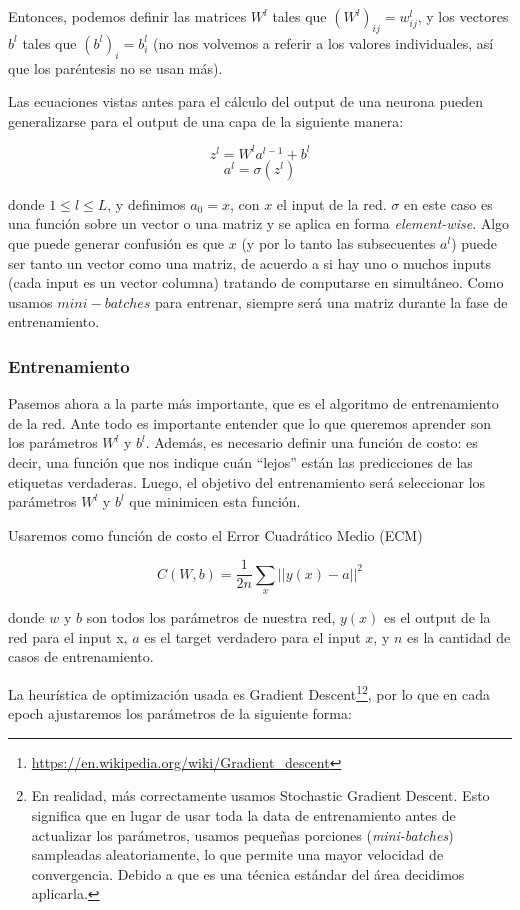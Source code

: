 Entonces, podemos definir las matrices $W^l$ tales que $(W^l)_{ij} = w^l_{ij}$, y los vectores $b^l$ tales que $(b^l)_i = b^l_i$ (no nos volvemos a referir a los valores individuales, así que los paréntesis no se usan más).

Las ecuaciones vistas antes para el cálculo del output de una neurona pueden generalizarse para el output de una capa de la siguiente manera:

$$z^l = W^l a^{l-1} + b^l$$
$$a^l = \sigma (z^l)$$

donde $1\leq l\leq L$, y definimos $a_0 = x$, con $x$ el input de la red. $\sigma$ en este caso es una función sobre un vector o una matriz y se aplica en forma \emph{element-wise}. Algo que puede generar confusión es que $x$ (y por lo tanto las subsecuentes $a^l$) puede ser tanto un vector como una matriz, de acuerdo a si hay uno o muchos inputs (cada input es un vector columna) tratando de computarse en simultáneo. Como usamos $mini-batches$ para entrenar, siempre será una matriz durante la fase de entrenamiento.

\subsubsection{Entrenamiento}

Pasemos ahora a la parte más importante, que es el algoritmo de entrenamiento de la red. Ante todo es importante entender que lo que queremos aprender son los parámetros $W^l$ y $b^l$. Además, es necesario definir una función de costo: es decir, una función que nos indique cuán ``lejos'' están las predicciones de las etiquetas verdaderas. Luego, el objetivo del entrenamiento será seleccionar los parámetros $W^l$ y $b^l$ que minimicen esta función.

Usaremos como función de costo el Error Cuadrático Medio (ECM)

$$C(W, b) = \frac{1}{2n}\sum_{x}{||y(x) - a||^2}$$

donde $w$ y $b$ son todos los parámetros de nuestra red, $y(x)$ es el output de la red para el input x, $a$ es el target verdadero para el input $x$, y $n$ es la cantidad de casos de entrenamiento.

La heurística de optimización usada es Gradient Descent\footnote{\url{https://en.wikipedia.org/wiki/Gradient_descent}}\footnote{En realidad, más correctamente usamos Stochastic Gradient Descent. Esto significa que en lugar de usar toda la data de entrenamiento antes de actualizar los parámetros, usamos pequeñas porciones  (\emph{mini-batches}) sampleadas aleatoriamente, lo que permite una mayor velocidad de convergencia. Debido a que es una técnica estándar del área decidimos aplicarla.}, por lo que en cada epoch ajustaremos los parámetros de la siguiente forma:

